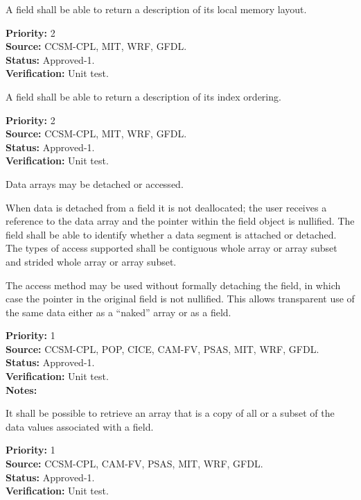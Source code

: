 A field shall be able to return a description of its local memory 
layout.
\begin{reqlist}
{\bf Priority:} 2 \\
{\bf Source:} CCSM-CPL, MIT, WRF, GFDL. \\
{\bf Status:} Approved-1. \\
{\bf Verification:} Unit test. 
\end{reqlist}

A field shall be able to return a description of its index ordering.
\begin{reqlist}
{\bf Priority:} 2 \\
{\bf Source:} CCSM-CPL, MIT, WRF, GFDL. \\
{\bf Status:} Approved-1. \\
{\bf Verification:} Unit test. 
\end{reqlist}

Data arrays may be detached or accessed.  

When data is detached from a field it is not deallocated; the user receives 
a reference to the data array and the pointer within the field object
is nullified.  The field shall be able to identify 
whether a data segment is attached or detached.  The types of access 
supported shall be contiguous whole array or array subset and strided whole 
array or array subset.

The access method may be used without formally detaching the field,
in which case the pointer in the original field is not nullified. This
allows transparent use of the same data either as a ``naked'' array or
as a field.

\begin{reqlist}
{\bf Priority:} 1 \\
{\bf Source:} CCSM-CPL, POP, CICE, CAM-FV, PSAS, MIT, WRF, GFDL. \\
{\bf Status:} Approved-1. \\
{\bf Verification:} Unit test. \\ 
{\bf Notes:}
\end{reqlist}

It shall be possible to retrieve an array that is a copy of all or
a subset of the data values associated with a field.
\begin{reqlist}
{\bf Priority:} 1 \\
{\bf Source:} CCSM-CPL, CAM-FV, PSAS, MIT, WRF, GFDL. \\
{\bf Status:} Approved-1. \\
{\bf Verification:} Unit test. 
\end{reqlist}

